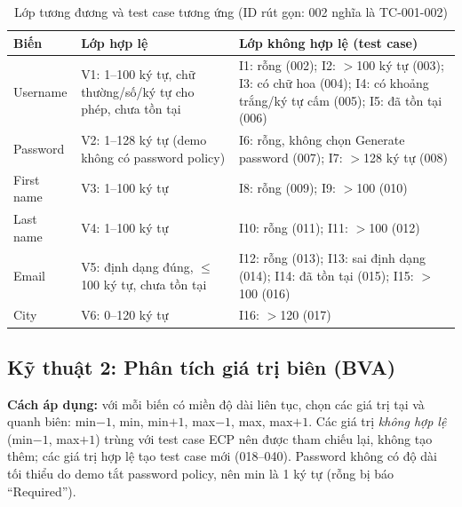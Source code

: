 \documentclass[12pt,a4paper]{article}
\begin{document}
\begin{table}[H]
\centering\footnotesize
\begin{tabular}{|l|L{5.0cm}|L{7.4cm}|}
\hline
{}\textbf{Biến} & \textbf{Lớp hợp lệ} & \textbf{Lớp không hợp lệ (test case)} \\ \hline
Username & V1: 1--100 ký tự, chữ thường/số/ký tự cho phép, chưa tồn tại &
 I1: rỗng (002); I2: $>$100 ký tự (003); I3: có chữ hoa (004); I4: có khoảng trắng/ký tự cấm (005); I5: đã tồn tại (006) \\ \hline
Password & V2: 1--128 ký tự (demo không có password policy) & I6: rỗng, không chọn Generate password (007); I7: $>$128 ký tự (008) \\ \hline
First name & V3: 1--100 ký tự & I8: rỗng (009); I9: $>$100 (010) \\ \hline
Last name & V4: 1--100 ký tự & I10: rỗng (011); I11: $>$100 (012) \\ \hline
Email & V5: định dạng đúng, $\leq$100 ký tự, chưa tồn tại & I12: rỗng (013); I13: sai định dạng (014); I14: đã tồn tại (015); I15: $>$100 (016) \\ \hline
City & V6: 0--120 ký tự & I16: $>$120 (017) \\ \hline
\end{tabular}
\caption{Lớp tương đương và test case tương ứng (ID rút gọn: 002 nghĩa là TC-001-002)}
\end{table}

\subsection{Kỹ thuật 2: Phân tích giá trị biên (BVA)}
\textbf{Cách áp dụng:} với mỗi biến có miền độ dài liên tục, chọn các giá trị tại và quanh biên: min$-1$, min, min$+1$,
max$-1$, max, max$+1$. Các giá trị \emph{không hợp lệ} (min$-1$, max$+1$) trùng với test case ECP nên được tham chiếu lại,
không tạo thêm; các giá trị hợp lệ tạo test case mới (018--040). Password không có độ dài tối thiểu do demo tắt password policy,
nên min là 1 ký tự (rỗng bị báo ``Required'').
\end{document}
